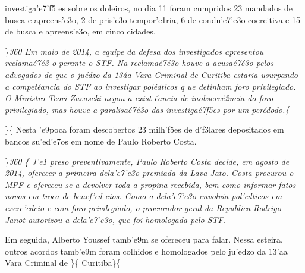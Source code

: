 investiga'e7'f5 es sobre os doleiros, no dia 11 foram cumpridos 23
mandados de busca e apreens'e3o, 2 de pris'e3o tempor'e1ria, 6 de
condu'e7'e3o coercitiva e 15 de busca e apreens'e3o, em cinco cidades.
\par \}\pard \ltrpar\qj {}\sl360\widctlpar\wrapdefault\faauto{} {\rtlch{}  \ltrch{}  Em maio de 2014, }{\rtlch{}  \ltrch{}  
a equipe da defesa dos investigados}{\rtlch{}  \ltrch{}   }{\rtlch{}  \ltrch{}  apresentou}{\rtlch{}  \ltrch{}   reclama\'e7\'e3
o perante o STF. Na reclama\'e7\'e3o houve a acusa\'e7\'e3o pelos advogados de que o ju\'edzo da 13\'aa Vara Criminal de }{\rtlch{}  \ltrch{}  Curitiba}{\rtlch{}  \ltrch{}  
 estaria usurpando a compet\'eancia do STF ao investigar pol\'edticos q}{\rtlch{}  \ltrch{}  ue detinham foro privilegiado.  }{\rtlch{}  \ltrch{}  O Ministro Teori Zavascki negou a exist
\'eancia de inobserv\'e2ncia do foro privilegiado, mas houve a paralisa\'e7\'e3o das investiga\'e7\'f5es por um per\'edodo.}\{\rtlch{}
 \ltrch{}  \par \}\{\rtlch{}  \ltrch{}
 Nesta 'e9poca foram descobertos 23
milh'f5es de d'f3lares depositados em bancos su'ed'e7os em nome de Paulo
Roberto Costa.\\
\par \}\pard \ltrpar\qj {}\sl360\widctlpar\wrapdefault\faauto{} \{\rtlch{}
 \ltrch{}  J'e1 preso
preventivamente, Paulo Roberto Costa decide, em agosto de 2014, oferecer
a primeira dela'e7'e3o premiada da Lava Jato. Costa procurou o MPF e
ofereceu-se a devolver toda a propina recebida, bem como informar fatos
novos em troca de benef'ed cios. Como a dela'e7'e3o envolvia pol'edticos
em exerc'edcio e com foro privilegiado, o procurador geral da Republica
Rodrigo Janot autorizou a dela'e7'e3o, que foi homologada pelo STF.
\par Em seguida, Alberto Youssef tamb'e9m se ofereceu para falar. Nessa
esteira, outros acordos tamb'e9m foram colhidos e homologados pelo
ju'edzo da 13'aa Vara Criminal de \}\{\rtlch{}  \ltrch{}
 Curitiba\}\{\rtlch{}  \ltrch{}
